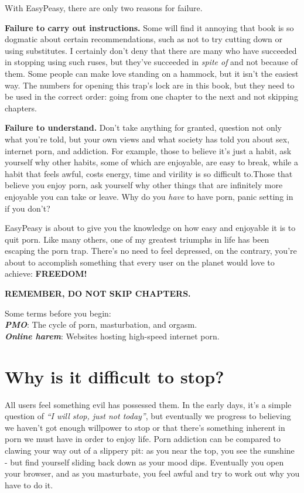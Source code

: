 \documentclass[
]{book}
\begin{document}
With EasyPeasy, there are only two reasons for failure.

\textbf{Failure to carry out instructions.}
Some will find it annoying that book is so dogmatic about certain recommendations, such as not to try cutting down or using substitutes. I certainly don't deny that there are many who have succeeded in stopping using such ruses, but they've succeeded in \emph{spite of} and not because of them. Some people can make love standing on a hammock, but it isn't the easiest way. The numbers for opening this trap's lock are in this book, but they need to be used in the correct order: going from one chapter to the next and not skipping chapters.

\textbf{Failure to understand.}
Don't take anything for granted, question not only what you're told, but your own views and what society has told you about sex, internet porn, and addiction. For example, those to believe it's just a habit, ask yourself why other habits, some of which are enjoyable, are easy to break, while a habit that feels awful, costs energy, time and virility is so difficult to.Those that believe you enjoy porn, ask yourself why other things that are infinitely more enjoyable you can take or leave. Why do you \emph{have} to have porn, panic setting in if you don't?

EasyPeasy is about to give you the knowledge on how easy and enjoyable it is to quit porn. Like many others, one of my greatest triumphs in life has been escaping the porn trap. There's no need to feel depressed, on the contrary, you're about to accomplish something that every user on the planet would love to achieve: \textbf{FREEDOM!}

\textbf{REMEMBER, DO NOT SKIP CHAPTERS.}

Some terms before you begin:\\
\textbf{\emph{PMO}}: The cycle of porn, masturbation, and orgasm.\\
\textbf{\emph{Online harem}}: Websites hosting high-speed internet porn.

\hypertarget{why-is-it-difficult-to-stop}{%
\chapter{Why is it difficult to stop?}\label{why-is-it-difficult-to-stop}}

All users feel something evil has possessed them. In the early days, it's a simple question of \emph{``I will stop, just not today''}, but eventually we progress to believing we haven't got enough willpower to stop or that there's something inherent in porn we must have in order to enjoy life. Porn addiction can be compared to clawing your way out of a slippery pit: as you near the top, you see the sunshine - but find yourself sliding back down as your mood dips. Eventually you open your browser, and as you masturbate, you feel awful and try to work out why you have to do it.
\end{document}
